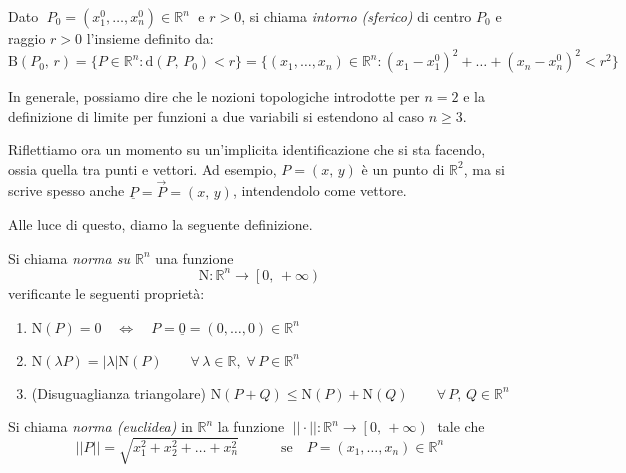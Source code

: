 \begin{definition}
Dato $\; P_0 = (x_1^0,\ldots,x_n^0) \in \mathbb{R}^n \;$ e $r>0$, si chiama \emph{intorno (sferico)} di centro $P_0$ e raggio $r>0$ l'insieme definito da:
$$\mathrm{B}(P_0,\, r)=
\lbrace P \in \mathbb{R}^n : \mathrm{d}(P,\, P_0) < r \rbrace = \lbrace (x_1,\ldots,x_n) \in \mathbb{R}^n : (x_1-x_1^0)^2 + \ldots + (x_n-x_n^0)^2 < r^2 \rbrace$$
\end{definition}

In generale, possiamo dire che le nozioni topologiche introdotte per $n=2$ e la definizione di limite per funzioni a due variabili si estendono al caso $n \geq 3$.

Riflettiamo ora un momento su un'implicita identificazione che si sta facendo, ossia quella tra punti e vettori. Ad esempio, $P = (x,\, y)$ è un punto di $\mathbb{R}^2$, ma si scrive spesso anche $\underline{P} = \overset{\rightarrow}{P} = (x,\, y)$, intendendolo come vettore.

Alle luce di questo, diamo la seguente definizione. 

\begin{definition}
Si chiama \emph{norma su $\mathbb{R}^n$} una funzione $$\mathrm{N}:\mathbb{R}^n \longrightarrow \left[0,\, +\infty\right)$$
verificante le seguenti proprietà:
\begin{enumerate}[labelindent=\parindent,leftmargin=*,label=\textnormal{(N\arabic*)},start=1]
\item $\mathrm{N}(P)=0 \quad \Longleftrightarrow \quad P=\underline{0}=(0,\ldots,0) \in \mathbb{R}^n$
\item $\mathrm{N}(\lambda P) = |\lambda|\mathrm{N}(P) \qquad \forall \, \lambda \in \mathbb{R}, \; \forall \, P \in \mathbb{R}^n$
\item (Disuguaglianza triangolare) $\mathrm{N}(P+Q) \leq \mathrm{N}(P) + \mathrm{N}(Q) \qquad \forall \, P,\, Q \in \mathbb{R}^n$
\end{enumerate}
\begin{center}
\def\svgwidth{7cm}

\end{center}
\end{definition}

\begin{definition}
Si chiama \emph{norma (euclidea)} in $\mathbb{R}^n$ la funzione $\; ||\cdot||:\mathbb{R}^n \longrightarrow \left[0,\, +\infty \right) \;$ tale che
$$||P|| = \sqrt{x_1^2+x_2^2+\ldots+x_n^2} \qquad \quad \text{se} \quad P=(x_1,\ldots,x_n) \in \mathbb{R}^n$$
\end{definition}

